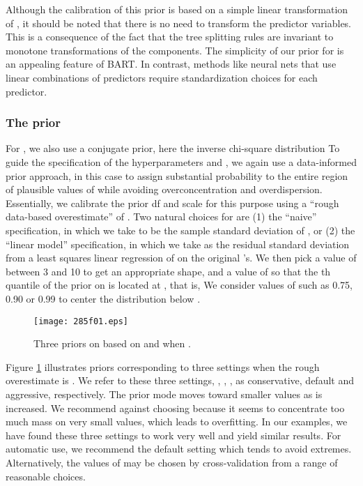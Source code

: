 \documentclass[aoas,nameyear,dvips]{arximspdf}
\begin{document}
Although the calibration of this prior is based on a simple linear
transformation of , it should be noted that there is no need to
transform the predictor variables.  This is a consequence of the
fact that the tree splitting rules are invariant to monotone
transformations of the  components.   The simplicity of
our prior for  is an appealing feature of BART.
In contrast, methods like neural nets that use linear combinations
of predictors require standardization choices for each predictor.


\subsubsection{The  prior}\label{sec:sigmaprior}

For , we also use a conjugate prior, here the inverse chi-square distribution
  To guide the specification
of the hyperparameters  and , we again use a data-informed prior approach,
in this case to assign substantial probability to the entire region of
plausible values of  while avoiding overconcentration and overdispersion.
Essentially, we calibrate the prior df  and scale  for this purpose
using a ``rough data-based overestimate''
 of .  Two natural choices for  are (1) the ``naive''
specification, in which we take  to be the sample
standard deviation of , or (2) the ``linear model''
specification, in which we take  as the residual
standard deviation from a least squares linear regression of 
on the original 's.  We then pick a value of
 between 3 and 10 to get an appropriate shape, and a value of
 so that the th quantile of the prior on  is located at
, that is,   We consider values of  such as
0.75, 0.90 or 0.99 to center the distribution below .


\begin{figure}

\texttt{[image: 285f01.eps]}

\caption{Three priors on  based on  and 
when .}\label{fig:sigmaprior}
\end{figure}

Figure \ref{fig:sigmaprior} illustrates priors corresponding to
three  settings when the rough overestimate is
.  We refer to these three settings, , , , as conservative, default
and aggressive, respectively.  The prior mode moves toward
smaller  values as  is increased.  We recommend against
choosing  because it seems to concentrate too much mass
on very small  values, which leads to overfitting. In our
examples, we have found these three settings to work very well and
yield similar results.  For automatic use, we recommend the
default setting  which tends to avoid
extremes.  Alternatively, the values of  may be chosen by
cross-validation from a range of
reasonable choices.
\end{document}
